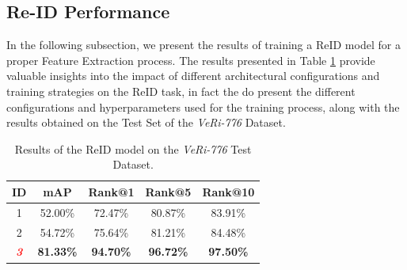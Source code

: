 \subsection{Re-ID Performance}
In the following subsection, we present the results of training a ReID model for a proper Feature Extraction process. The results presented in Table \ref{tab:ReIDPerformance} provide valuable insights into the impact of different architectural configurations and training strategies on the ReID task, in fact the do present the different configurations and hyperparameters used for the training process, along with the results obtained on the Test Set of the \textit{VeRi-776} Dataset.

\newpage

\begin{table}
    \centering %
    
    \vspace{5mm}
    
    \begin{tabular}{|c|c|c|c|c|}
        \hline
        \textbf{ID} & \textbf{mAP} & \textbf{Rank@1} & \textbf{Rank@5} & \textbf{Rank@10}\\ 
        \midrule
        1 & 52.00\% & 72.47\% & 80.87\% & 83.91\% \\ %
        \hline
        2 & 54.72\% & 75.64\% & 81.21\% & 84.48\% \\ %
        \hline
        \textcolor{red}{\textit{\textbf{3}}} & \textbf{81.33\%} & \textbf{94.70\%} & \textbf{96.72\%} & \textbf{97.50\%} \\ %
        \hline
    \end{tabular}
    \vspace{0.5cm}
    \caption[ReID Results]{Results of the ReID model on the \textit{VeRi-776} Test Dataset.}
    \label{tab:ReIDPerformance}
\end{table}

